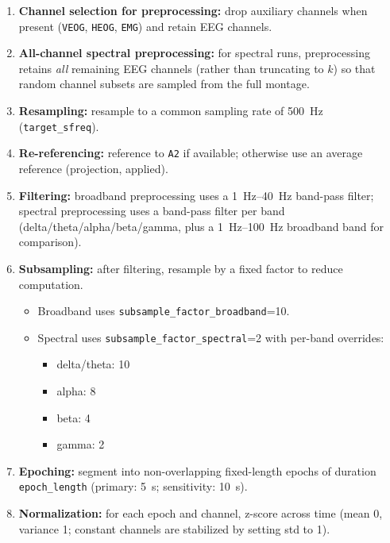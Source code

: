 \documentclass[11pt]{article}
\begin{document}
\begin{enumerate}[leftmargin=*]
    \item \textbf{Channel selection for preprocessing:} drop auxiliary channels when present (\texttt{VEOG}, \texttt{HEOG}, \texttt{EMG}) and retain EEG channels.
    \item \textbf{All-channel spectral preprocessing:} for spectral runs, preprocessing retains \emph{all} remaining EEG channels (rather than truncating to $k$) so that random channel subsets are sampled from the full montage.
    \item \textbf{Resampling:} resample to a common sampling rate of \SI{500}{Hz} (\texttt{target\_sfreq}).
    \item \textbf{Re-referencing:} reference to \texttt{A2} if available; otherwise use an average reference (projection, applied).
    \item \textbf{Filtering:}
    broadband preprocessing uses a \SIrange{1}{40}{Hz} band-pass filter;
    spectral preprocessing uses a band-pass filter per band (delta/theta/alpha/beta/gamma, plus a \SIrange{1}{100}{Hz} broadband band for comparison).
    \item \textbf{Subsampling:} after filtering, resample by a fixed factor to reduce computation.
    \begin{itemize}[leftmargin=*]
        \item Broadband uses \texttt{subsample\_factor\_broadband}=10.
        \item Spectral uses \texttt{subsample\_factor\_spectral}=2 with per-band overrides:
        \begin{itemize}[leftmargin=*]
            \item delta/theta: 10
            \item alpha: 8
            \item beta: 4
            \item gamma: 2
        \end{itemize}
    \end{itemize}
    \item \textbf{Epoching:} segment into non-overlapping fixed-length epochs of duration \texttt{epoch\_length} (primary: \SI{5}{s}; sensitivity: \SI{10}{s}).
    \item \textbf{Normalization:} for each epoch and channel, z-score across time (mean 0, variance 1; constant channels are stabilized by setting std to 1).
\end{enumerate}
\end{document}
